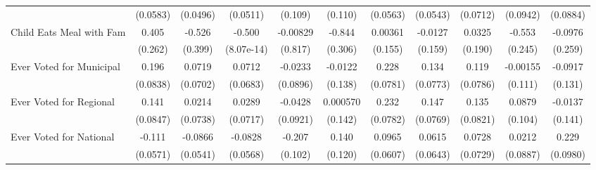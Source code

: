 {\begin{tabular}{l*{10}{c}}
            &    (0.0583)         &    (0.0496)         &    (0.0511)         &     (0.109)         &     (0.110)         &    (0.0563)         &    (0.0543)         &    (0.0712)         &    (0.0942)         &    (0.0884)         \\
\addlinespace
Child Eats Meal with Fam&       0.405         &      -0.526         &      -0.500\sym{***}&    -0.00829         &      -0.844\sym{**} &     0.00361         &     -0.0127         &      0.0325         &      -0.553\sym{*}  &     -0.0976         \\
            &     (0.262)         &     (0.399)         &  (8.07e-14)         &     (0.817)         &     (0.306)         &     (0.155)         &     (0.159)         &     (0.190)         &     (0.245)         &     (0.259)         \\
\addlinespace
Ever Voted for Municipal&       0.196\sym{*}  &      0.0719         &      0.0712         &     -0.0233         &     -0.0122         &       0.228\sym{**} &       0.134         &       0.119         &    -0.00155         &     -0.0917         \\
            &    (0.0838)         &    (0.0702)         &    (0.0683)         &    (0.0896)         &     (0.138)         &    (0.0781)         &    (0.0773)         &    (0.0786)         &     (0.111)         &     (0.131)         \\
\addlinespace
Ever Voted for Regional&       0.141         &      0.0214         &      0.0289         &     -0.0428         &    0.000570         &       0.232\sym{**} &       0.147         &       0.135         &      0.0879         &     -0.0137         \\
            &    (0.0847)         &    (0.0738)         &    (0.0717)         &    (0.0921)         &     (0.142)         &    (0.0782)         &    (0.0769)         &    (0.0821)         &     (0.104)         &     (0.141)         \\
\addlinespace
Ever Voted for National&      -0.111         &     -0.0866         &     -0.0828         &      -0.207\sym{*}  &       0.140         &      0.0965         &      0.0615         &      0.0728         &      0.0212         &       0.229\sym{*}  \\
            &    (0.0571)         &    (0.0541)         &    (0.0568)         &     (0.102)         &     (0.120)         &    (0.0607)         &    (0.0643)         &    (0.0729)         &    (0.0887)         &    (0.0980)         \\
\bottomrule
\end{tabular}
}
